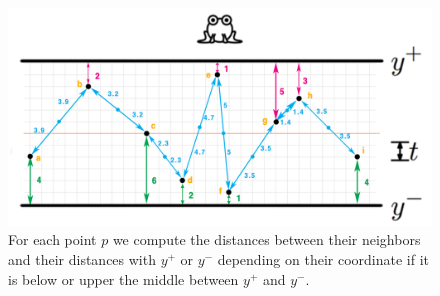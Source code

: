 \documentclass[12pt]{article}
\begin{document}
\begin{figure}[H]
	\centering
	\includegraphics[scale=0.35]{img/problem2-1.png}
	\caption{For each point $p$ we compute the distances between their neighbors and their distances with $y^+$ or $y^-$ depending on their  coordinate if it is below or upper the middle between $y^+$ and $y^-$.} \label{fig:1a}
\end{figure}
\end{document}
